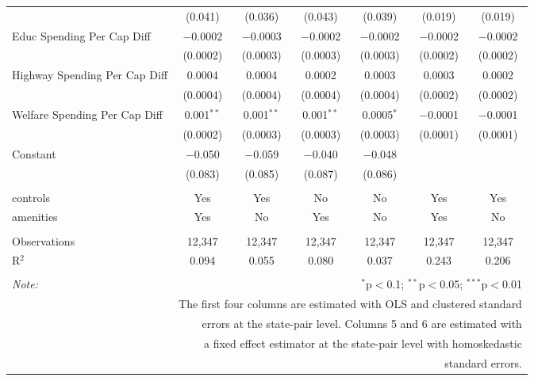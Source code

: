 \begin{table}[!htbp]
\begin{tabular}{@{\extracolsep{5pt}}lcccccc}
  & (0.041) & (0.036) & (0.043) & (0.039) & (0.019) & (0.019) \\ 
  Educ Spending Per Cap Diff & $-$0.0002 & $-$0.0003 & $-$0.0002 & $-$0.0002 & $-$0.0002 & $-$0.0002 \\ 
  & (0.0002) & (0.0003) & (0.0003) & (0.0003) & (0.0002) & (0.0002) \\ 
  Highway Spending Per Cap Diff & 0.0004 & 0.0004 & 0.0002 & 0.0003 & 0.0003 & 0.0002 \\ 
  & (0.0004) & (0.0004) & (0.0004) & (0.0004) & (0.0002) & (0.0002) \\ 
  Welfare Spending Per Cap Diff & 0.001$^{**}$ & 0.001$^{**}$ & 0.001$^{**}$ & 0.0005$^{*}$ & $-$0.0001 & $-$0.0001 \\ 
  & (0.0002) & (0.0003) & (0.0003) & (0.0003) & (0.0001) & (0.0001) \\ 
  Constant & $-$0.050 & $-$0.059 & $-$0.040 & $-$0.048 &  &  \\ 
  & (0.083) & (0.085) & (0.087) & (0.086) &  &  \\ 
 \hline \\[-1.8ex] 
controls & Yes & Yes & No & No & Yes & Yes \\ 
amenities & Yes & No & Yes & No & Yes & No \\ 
\hline \\[-1.8ex] 
Observations & 12,347 & 12,347 & 12,347 & 12,347 & 12,347 & 12,347 \\ 
R$^{2}$ & 0.094 & 0.055 & 0.080 & 0.037 & 0.243 & 0.206 \\ 
\hline 
\hline \\[-1.8ex] 
\textit{Note:}  & \multicolumn{6}{r}{$^{*}$p$<$0.1; $^{**}$p$<$0.05; $^{***}$p$<$0.01} \\ 
 & \multicolumn{6}{r}{The first four columns are estimated with OLS and clustered standard} \\ 
 & \multicolumn{6}{r}{ errors at the state-pair level. Columns 5 and 6 are estimated with} \\ 
 & \multicolumn{6}{r}{a fixed effect estimator at the state-pair level with homoskedastic} \\ 
 & \multicolumn{6}{r}{standard errors.} \\ 
\end{tabular} 
\end{table} 
